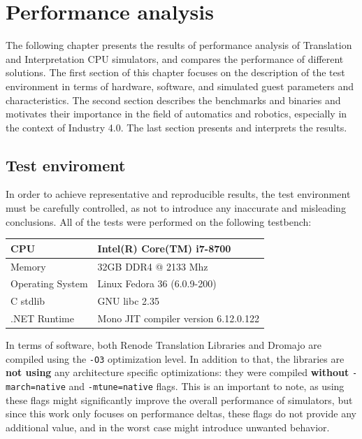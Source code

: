 \chapter{Performance analysis}
\label{chap:analysis}

The following chapter presents the results of performance analysis of Translation and Interpretation CPU simulators,
and compares the performance of different solutions. The first section of this chapter focuses
on the description of the test environment in terms of hardware, software, and simulated guest parameters and
characteristics. The second section describes the benchmarks and binaries and motivates their importance in the field
of automatics and robotics, especially in the context of Industry 4.0. The last section presents and interprets
the results.

\section{Test enviroment}
In order to achieve representative and reproducible results, the test environment must be carefully controlled, as not
to introduce any inaccurate and misleading conclusions. All of the tests were performed on the following testbench:

\begin{table}[h!]
    \centering
    \begin{tabular}{l|l}
    CPU              & Intel(R) Core(TM) i7-8700             \\
    \hline
    Memory           & 32GB DDR4 @ 2133 Mhz                  \\
    \hline
    Operating System & Linux Fedora 36 (6.0.9-200)           \\
    \hline
    C stdlib         & GNU libc 2.35                         \\
    \hline
    .NET Runtime     & Mono JIT compiler version 6.12.0.122
    \end{tabular}
\end{table}

\noindent
In terms of software, both Renode Translation Libraries and Dromajo are compiled using the \texttt{-O3} optimization
level. In addition to that, the libraries are \textbf{not using} any architecture specific optimizations:
they were compiled \textbf{without} \texttt{-march=native} and \texttt{-mtune=native} flags. This is an important
to note, as using these flags might significantly improve the overall performance of simulators, but since
this work only focuses on performance deltas, these flags do not provide any additional value, and in the worst
case might introduce unwanted behavior.

